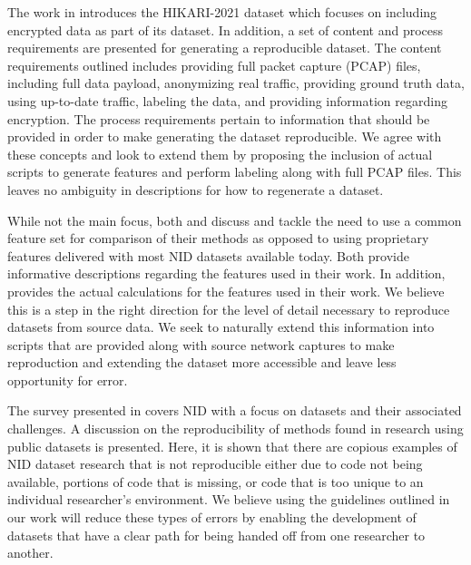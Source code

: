 \documentclass[sigconf, anonymous, screen]{acmart}
\begin{document}
The work in \cite{ferriyan2021} introduces the HIKARI-2021 dataset which focuses on including encrypted data as part of its dataset.
In addition, a set of content and process requirements are presented for generating a reproducible dataset.
The content requirements outlined includes providing full packet capture (PCAP) files, including full data payload, anonymizing real traffic,  providing ground truth data, using up-to-date traffic, labeling the data, and providing information regarding encryption.
The process requirements pertain to information that should be provided in order to make generating the dataset reproducible.
We agree with these concepts and look to extend them by proposing the inclusion of actual scripts to generate features and perform labeling along with full PCAP files.
This leaves no ambiguity in descriptions for how to regenerate a dataset.

While not the main focus, both \cite{e23111532} and \cite{layeghy2021} discuss and tackle the need to use a common feature set for comparison of their methods as opposed to using proprietary features delivered with most NID datasets available today.
Both provide informative descriptions regarding the features used in their work.
In addition, \cite{layeghy2021} provides the actual calculations for the features used in their work.
We believe this is a step in the right direction for the level of detail necessary to reproduce datasets from source data. 
We seek to naturally extend this information into scripts that are provided along with source network captures to make reproduction and extending the dataset more accessible and leave less opportunity for error.

The survey presented in \cite{Chou2022} covers NID with a focus on datasets and their associated challenges.
A discussion on the reproducibility of methods found in research using public datasets is presented.
Here, it is shown that there are copious examples of NID dataset research that is not reproducible either due to code not being available, portions of code that is missing, or code that is too unique to an individual researcher's environment.
We believe using the guidelines outlined in our work will reduce these types of errors by enabling the development of datasets that have a clear path for being handed off from one researcher to another.
\end{document}
